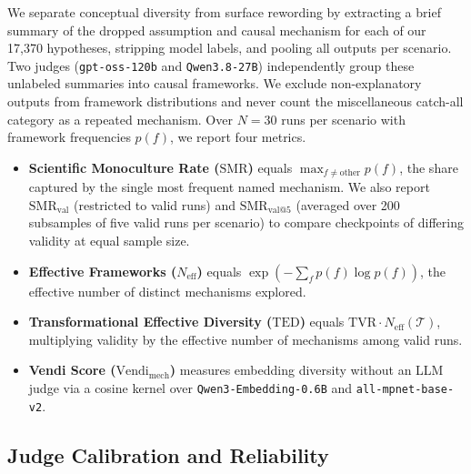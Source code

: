 \documentclass{article}
\begin{document}
We separate conceptual diversity from surface rewording by extracting a brief summary of the dropped assumption and causal mechanism for each of our 17,370 hypotheses, stripping model labels, and pooling all outputs per scenario. Two judges (\texttt{gpt-oss-120b} and \texttt{Qwen3.8-27B}) independently group these unlabeled summaries into causal frameworks. We exclude non-explanatory outputs from framework distributions and never count the miscellaneous catch-all category as a repeated mechanism. Over $N=30$ runs per scenario with framework frequencies $p(f)$, we report four metrics.
\begin{itemize}[leftmargin=1.5em, itemsep=0pt, topsep=1pt]
\item \textbf{Scientific Monoculture Rate ($\mathrm{SMR}$)} equals $\max_{f \neq \mathrm{other}} p(f)$, the share captured by the single most frequent named mechanism. We also report $\mathrm{SMR}_{\mathrm{val}}$ (restricted to valid runs) and $\mathrm{SMR}_{\mathrm{val}@5}$ (averaged over 200 subsamples of five valid runs per scenario) to compare checkpoints of differing validity at equal sample size.
\item \textbf{Effective Frameworks ($N_{\mathrm{eff}}$)} equals $\exp(-\sum_f p(f)\log p(f))$, the effective number of distinct mechanisms explored.
\item \textbf{Transformational Effective Diversity ($\mathrm{TED}$)} equals $\mathrm{TVR} \cdot N_{\mathrm{eff}}(\mathcal{T})$, multiplying validity by the effective number of mechanisms among valid runs.
\item \textbf{Vendi Score ($\mathrm{Vendi}_{\mathrm{mech}}$)} \citep{friedman2023vendi} measures embedding diversity without an LLM judge via a cosine kernel over \texttt{Qwen3-Embedding-0.6B} and \texttt{all-mpnet-base-v2}.
\end{itemize}

\subsection{Judge Calibration and Reliability}
\end{document}

